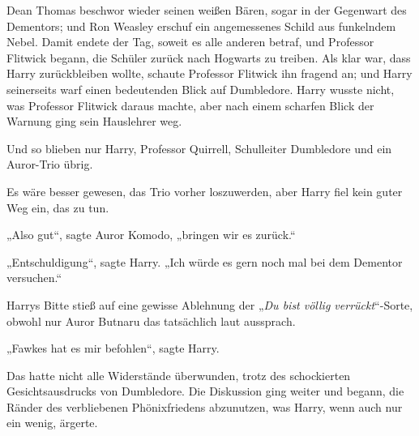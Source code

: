 Dean Thomas beschwor wieder seinen weißen Bären, sogar in der Gegenwart des Dementors; und Ron Weasley erschuf ein angemessenes Schild aus funkelndem Nebel. Damit endete der Tag, soweit es alle anderen betraf, und Professor Flitwick begann, die Schüler zurück nach Hogwarts zu treiben. Als klar war, dass Harry zurückbleiben wollte, schaute Professor Flitwick ihn fragend an; und Harry seinerseits warf einen bedeutenden Blick auf Dumbledore. Harry wusste nicht, was Professor Flitwick daraus machte, aber nach einem scharfen Blick der Warnung ging sein Hauslehrer weg.

Und so blieben nur Harry, Professor Quirrell, Schulleiter Dumbledore und ein Auror-Trio übrig.

Es wäre besser gewesen, das Trio vorher loszuwerden, aber Harry fiel kein guter Weg ein, das zu tun.

„Also gut“, sagte Auror Komodo, „bringen wir es zurück.“

„Entschuldigung“, sagte Harry.
„Ich würde es gern noch mal bei dem Dementor versuchen.“

\later

Harrys Bitte stieß auf eine gewisse Ablehnung der
„\emph{Du bist völlig verrückt}“-Sorte, obwohl nur Auror Butnaru das tatsächlich laut aussprach.

„Fawkes hat es mir befohlen“, sagte Harry.

Das hatte nicht alle Widerstände überwunden, trotz des schockierten Gesichtsausdrucks von Dumbledore. Die Diskussion ging weiter und begann, die Ränder des verbliebenen Phönixfriedens abzunutzen, was Harry, wenn auch nur ein wenig, ärgerte.

